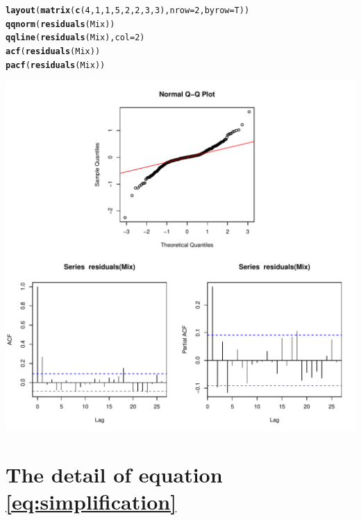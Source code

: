 \documentclass{article}\usepackage[]{graphicx}\usepackage[]{color}
\makeatletter
\def\maxwidth{ %
  \ifdim\Gin@nat@width>\linewidth
    \linewidth
  \else
    \Gin@nat@width
  \fi
}
\newcommand{\hlnum}[1]{\textcolor[rgb]{0.686,0.059,0.569}{#1}}%
\newcommand{\hlstd}[1]{\textcolor[rgb]{0.345,0.345,0.345}{#1}}%
\newcommand{\hlkwc}[1]{\textcolor[rgb]{0.333,0.667,0.333}{#1}}%
\newcommand{\hlkwd}[1]{\textcolor[rgb]{0.737,0.353,0.396}{\textbf{#1}}}%
\newenvironment{kframe}{%
 \def\at@end@of@kframe{}%
 \ifinner\ifhmode%
  \def\at@end@of@kframe{\end{minipage}}%
  \begin{minipage}{\columnwidth}%
 \fi\fi%
 \def\FrameCommand##1{\hskip\@totalleftmargin \hskip-\fboxsep
 \colorbox{shadecolor}{##1}\hskip-\fboxsep
     \hskip-\linewidth \hskip-\@totalleftmargin \hskip\columnwidth}%
 \MakeFramed {\advance\hsize-\width
   \@totalleftmargin\z@ \linewidth\hsize
   \@setminipage}}%
 {\par\unskip\endMakeFramed%
 \at@end@of@kframe}
\newenvironment{knitrout}{}{} %
\makeatother
\begin{document}
\begin{appendices}
\begin{knitrout}
\color{fgcolor}\begin{kframe}
\begin{alltt}
\hlkwd{layout}\hlstd{(}\hlkwd{matrix}\hlstd{(}\hlkwd{c}\hlstd{(}\hlnum{4}\hlstd{,}\hlnum{1}\hlstd{,}\hlnum{1}\hlstd{,}\hlnum{5}\hlstd{,}\hlnum{2}\hlstd{,}\hlnum{2}\hlstd{,}\hlnum{3}\hlstd{,}\hlnum{3}\hlstd{),}\hlkwc{nrow}\hlstd{=}\hlnum{2}\hlstd{,}\hlkwc{byrow}\hlstd{=T))}
\hlkwd{qqnorm}\hlstd{(}\hlkwd{residuals}\hlstd{(Mix))}
\hlkwd{qqline}\hlstd{(}\hlkwd{residuals}\hlstd{(Mix),}\hlkwc{col}\hlstd{=}\hlnum{2}\hlstd{)}
\hlkwd{acf}\hlstd{(}\hlkwd{residuals}\hlstd{(Mix))}
\hlkwd{pacf}\hlstd{(}\hlkwd{residuals}\hlstd{(Mix))}
\end{alltt}
\end{kframe}
\includegraphics[width=\maxwidth]{figure/unnamed-chunk-14-1} 

\end{knitrout}


\newpage

\section{The detail of equation \ref{eq:simplification}}\label{sec:krig}


\end{appendices}
\end{document}
